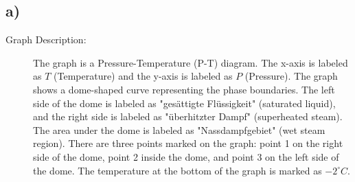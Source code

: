 

\subsection*{a)}

\begin{description}
    \item[Graph Description:] The graph is a Pressure-Temperature (P-T) diagram. The x-axis is labeled as $T$ (Temperature) and the y-axis is labeled as $P$ (Pressure). The graph shows a dome-shaped curve representing the phase boundaries. The left side of the dome is labeled as "gesättigte Flüssigkeit" (saturated liquid), and the right side is labeled as "überhitzter Dampf" (superheated steam). The area under the dome is labeled as "Nassdampfgebiet" (wet steam region). There are three points marked on the graph: point 1 on the right side of the dome, point 2 inside the dome, and point 3 on the left side of the dome. The temperature at the bottom of the graph is marked as $-2^\circ C$.
\end{description}